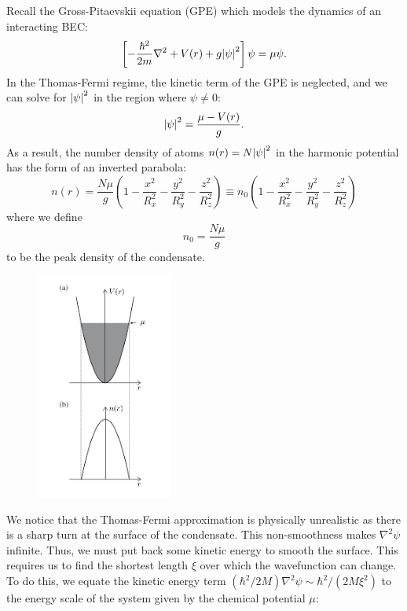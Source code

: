 \documentclass{book}
\theoremstyle{definition}
\newcommand{\f}[2]{\frac{#1}{#2}}
\newcommand{\lp}{\left(}
\newcommand{\rp}{\right)}
\newcommand{\lb}{\left[}
\newcommand{\rb}{\right]}
\begin{document}
Recall the Gross-Pitaevskii equation (GPE) which models the dynamics of an interacting BEC:
\begin{equation*}
\lb -\f{\hbar^2}{2m}\nabla^2  + V(r) + g\abs{\psi}^2\rb \psi = \mu \psi.
\end{equation*}
In the Thomas-Fermi regime, the kinetic term of the GPE is neglected, and we can solve for $\abs{\psi}^2$ in the region where $\psi \neq 0$:
\begin{equation*}
\abs{\psi}^2 = \f{\mu - V(r)}{g}.
\end{equation*}
As a result, the number density of atoms $n(r) = N \abs{\psi}^2$ in the harmonic potential has the form of an inverted parabola:
\begin{equation*}
n(r) = \f{N\mu}{g}\lp 1 - \f{x^2}{R_x^2} - \f{y^2}{R_y^2} - \f{z^2}{R_z^2} \rp \equiv n_0\lp 1 - \f{x^2}{R_x^2} - \f{y^2}{R_y^2} - \f{z^2}{R_z^2} \rp 
\end{equation*}
where we define 
\begin{equation*}
n_0 = \f{N\mu}{g}
\end{equation*}
to be the peak density of the condensate.
\begin{figure}[!htb]
	\centering
	\includegraphics[width=0.4\textwidth]{images/thomas-fermi.png}
\end{figure}
We notice that the Thomas-Fermi approximation is physically unrealistic as there is a sharp turn at the surface of the condensate. This non-smoothness makes $\nabla^2 \psi$ infinite. Thus, we must put back some kinetic energy to smooth the surface. This requires us to find the shortest length $\xi$ over which the wavefunction can change. To do this, we equate the kinetic energy term $(\hbar^2/2M)\nabla^2 \psi \sim \hbar^2 /(2M\xi^2)$ to the energy scale of the system given by the chemical potential $\mu$:
\end{document}
